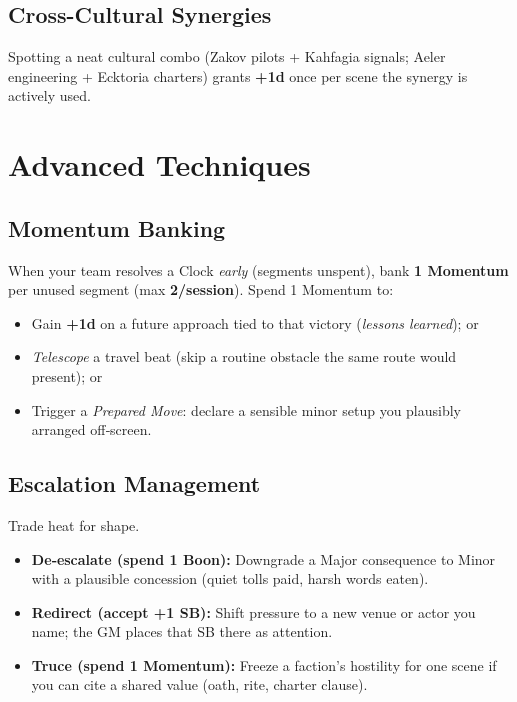 \subsection{Cross-Cultural Synergies}
Spotting a neat cultural combo (Zakov pilots + Kahfagia signals; Aeler engineering + Ecktoria charters) grants \textbf{+1d} once per scene the synergy is actively used.

\section{Advanced Techniques}

\subsection{Momentum Banking}\label{subsec:momentum-banking}
When your team resolves a Clock \emph{early} (segments unspent), bank \textbf{1 Momentum} per unused segment (max \textbf{2/session}). Spend 1 Momentum to:
\begin{itemize}
  \item Gain \textbf{+1d} on a future approach tied to that victory (\emph{lessons learned}); or
  \item \emph{Telescope} a travel beat (skip a routine obstacle the same route would present); or
  \item Trigger a \emph{Prepared Move}: declare a sensible minor setup you plausibly arranged off‑screen.
\end{itemize}

\subsection{Escalation Management}
Trade heat for shape.
\begin{itemize}
  \item \textbf{De‑escalate (spend 1 Boon):} Downgrade a Major consequence to Minor with a plausible concession (quiet tolls paid, harsh words eaten).
  \item \textbf{Redirect (accept +1 SB):} Shift pressure to a new venue or actor you name; the GM places that SB there as attention.
  \item \textbf{Truce (spend 1 Momentum):} Freeze a faction's hostility for one scene if you can cite a shared value (oath, rite, charter clause).
\end{itemize}


